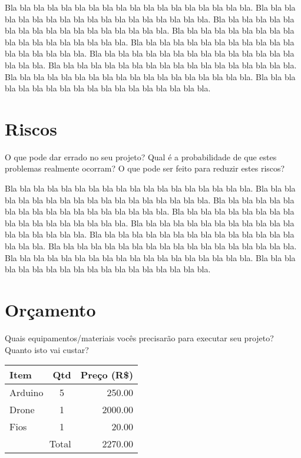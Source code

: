 \documentclass{acm_proc_article-sp}
\begin{document}
Bla bla bla bla bla bla bla bla bla bla bla bla bla bla bla bla bla bla.
Bla bla bla bla bla bla bla bla bla bla bla bla bla bla bla bla bla bla.
Bla bla bla bla bla bla bla bla bla bla bla bla bla bla bla bla bla bla.
Bla bla bla bla bla bla bla bla bla bla bla bla bla bla bla bla bla bla.
Bla bla bla bla bla bla bla bla bla bla bla bla bla bla bla bla bla bla.
Bla bla bla bla bla bla bla bla bla bla bla bla bla bla bla bla bla bla.
Bla bla bla bla bla bla bla bla bla bla bla bla bla bla bla bla bla bla.
Bla bla bla bla bla bla bla bla bla bla bla bla bla bla bla bla bla bla.
Bla bla bla bla bla bla bla bla bla bla bla bla bla bla bla bla bla bla.

\section{Riscos}

O que pode dar errado no seu projeto?
Qual é a probabilidade de que estes problemas realmente ocorram?
O que pode ser feito para reduzir estes riscos?

Bla bla bla bla bla bla bla bla bla bla bla bla bla bla bla bla bla bla.
Bla bla bla bla bla bla bla bla bla bla bla bla bla bla bla bla bla bla.
Bla bla bla bla bla bla bla bla bla bla bla bla bla bla bla bla bla bla.
Bla bla bla bla bla bla bla bla bla bla bla bla bla bla bla bla bla bla.
Bla bla bla bla bla bla bla bla bla bla bla bla bla bla bla bla bla bla.
Bla bla bla bla bla bla bla bla bla bla bla bla bla bla bla bla bla bla.
Bla bla bla bla bla bla bla bla bla bla bla bla bla bla bla bla bla bla.
Bla bla bla bla bla bla bla bla bla bla bla bla bla bla bla bla bla bla.
Bla bla bla bla bla bla bla bla bla bla bla bla bla bla bla bla bla bla.

\section{Orçamento}

Quais equipamentos/materiais vocês precisarão para executar seu projeto?
Quanto isto vai custar?

\begin{table}[h!]
\centering
\begin{tabular}{l|c|r}
Item & Qtd & Preço (R\$) \\
\hline
Arduino & 5 & 250.00 \\
Drone   & 1 & 2000.00 \\
Fios    & 1 & 20.00 \\
\hline
\multicolumn{2}{r}{Total} & 2270.00
\end{tabular}
\label{tab:my_label}
\end{table}
\end{document}
